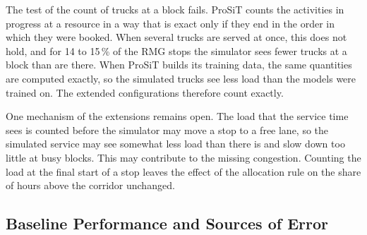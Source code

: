 The test of the count of trucks at a block fails. ProSiT counts the activities in
progress at a resource in a way that is exact only if they end in the order in which
they were booked. When several trucks are served at once, this does not hold, and for
14 to 15\,\% of the RMG stops the simulator sees fewer trucks at a block than are
there. When ProSiT builds its training data, the same quantities are computed exactly, so
the simulated trucks see less load than the models were trained on. The extended configurations therefore
count exactly.

One mechanism of the extensions remains open. The load that the service time sees is
counted before the simulator may move a stop to a free lane, so the simulated service
may see somewhat less load than there is and slow down too little at busy blocks.
This may contribute to the missing congestion. Counting the load at the final start
of a stop leaves the effect of the allocation rule on the share of hours above the
corridor unchanged.

\subsection{Baseline Performance and Sources of Error}
\label{sec:res_e4_start}
\label{sec:res_inspection}

